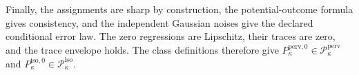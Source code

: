 Finally, the assignments are sharp by construction, the potential-outcome formula gives consistency, and the independent Gaussian noises give the declared conditional error law. The zero regressions are Lipschitz, their traces are zero, and the trace envelope holds. The class definitions therefore give \(P_{\kappa}^{\mathrm{perv},0}\in\mathcal P_{\kappa}^{\mathrm{perv}}\) and \(P_{\kappa}^{\mathrm{iso},0}\in\mathcal P_{\kappa}^{\mathrm{iso}}\).